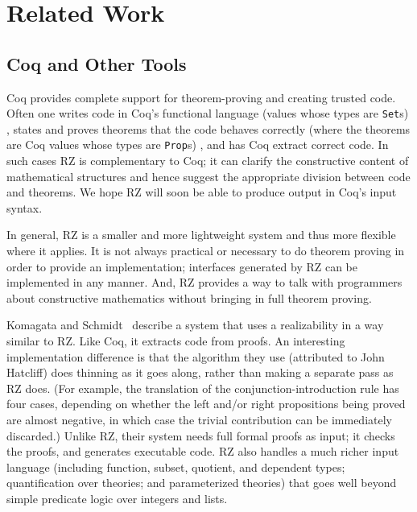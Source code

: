 \section{Related Work}
\label{sec:related-work}

\subsection{Coq and Other Tools}
\label{sec:comparison-with-coq}

Coq provides complete support for
theorem-proving and creating trusted code.  Often one
writes code in Coq's functional language%
\iflong 
 (values whose types are \texttt{Set}s)
\fi %
, states and proves theorems
that the code behaves correctly%
\iflong
 (where the theorems are Coq values whose types are \texttt{Prop}s)%
\fi %
, and has Coq extract
correct code. In such cases RZ is complementary to Coq; it can
\iflong
clarify the constructive content of mathematical
structures and hence 
\fi %
suggest the appropriate division between code
and theorems. We hope RZ will soon be able to 
produce output in Coq's input syntax.

\iflong
In general, RZ is a smaller and more lightweight system and thus more
flexible where it applies. It is not always practical or necessary to
do theorem proving in order to provide an implementation; interfaces
generated by RZ can be implemented in any manner. And, RZ provides a way to talk with
programmers about constructive mathematics without bringing in
full theorem proving.
\fi %

Komagata and Schmidt~\cite{komagata+:tr95} describe a system that uses
a realizability in a way similar to RZ.  Like Coq, it extracts code from
proofs.
%
An interesting implementation difference is that  the algorithm
they use (attributed to John Hatcliff) does thinning as it goes along,
rather than making a separate pass as RZ does.
%
\iflong
(For example, the translation of the
conjunction-introduction rule has four cases, depending on whether the
left and/or right propositions being proved are almost negative, in
which case the trivial contribution can be immediately discarded.)
\fi
%
Unlike RZ, their system needs full formal proofs as input; it checks
the proofs, and generates executable code.  RZ also handles a much
richer input language (including function, subset, quotient, and dependent
types; quantification over theories; and parameterized theories)
that goes well beyond simple predicate logic over integers and lists.

